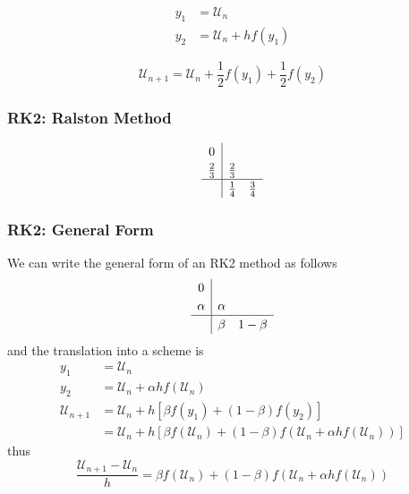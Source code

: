 \documentclass[12pt]{article}
\theoremstyle{definition}
\newcommand{\U}{\mathcal{U}}
\theoremstyle{definition}
\begin{document}
\begin{align*}
	y_1 &= \U_n \\
	y_2 &= \U_n + hf(y_1) 
\end{align*}

\begin{equation}
	\U_{n+1} = \U_n + \frac{1}{2}f(y_1) + \frac{1}{2}f(y_2)
\end{equation}

\subsubsection{RK2: Ralston Method}
\begin{equation}
	\renewcommand\arraystretch{1.2}
	\begin{array}
	{c|cc}
	0\\
	\frac{2}{3} & \frac{2}{3}\\
	\hline
	& \frac{1}{4} & \frac{3}{4}
	\end{array}
\end{equation}


\subsubsection{RK2: General Form}
We can write the general form of an RK2 method as follows
\begin{equation}
	\renewcommand\arraystretch{1.2}
	\begin{array}
	{c|cc}
	0\\
	\alpha & \alpha\\
	\hline
	& \beta & 1-\beta
	\end{array}
\end{equation}
and the translation into a scheme is
\begin{align*}
	y_1 &= \U_n \\
	y_2 &= \U_n + \alpha h f(\U_n) \\
	\U_{n+1} &= \U_n + h[\beta f(y_1) + (1-\beta)f(y_2)]\\
	&= \U_n + h[\beta f(\U_n) + (1-\beta)f(\U_n + \alpha h f(\U_n))]
\end{align*}
thus
\begin{equation}
	\frac{\U_{n+1}-\U_n}{h} = \beta f(\U_n) + (1-\beta)f(\U_n + \alpha h f(\U_n))
\end{equation}
\end{document}

